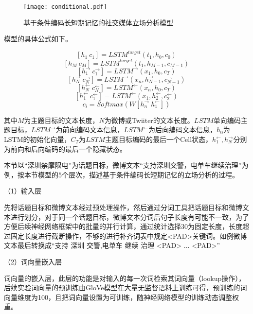 \begin{figure}[htbp]
	\centering
	\texttt{[image: conditional.pdf]}
	\caption[rnn_vanish]{基于条件编码长短期记忆的社交媒体立场分析模型}
\end{figure}

模型的具体公式如下。

\begin{equation}\label{lstm_f}[h_1~c_1] = LSTM^{target}(t_1,h_0,c_0)\end{equation}
\begin{equation}\label{lstm_f}[h_M~c_M] = LSTM^{target}(t_1,h_{M-1},c_{M-1})\end{equation}
\begin{equation}\label{lstm_f}[h^{→}_{1}~c^{→}_{1}] = LSTM^{→}(x_1,h_0,c_T)\end{equation}
\begin{equation}\label{lstm_f}[h^{→}_{N}~c^{→}_{N}] = LSTM^{→}(x_n,h^{→}_{N-1},c^{→}_{N-1})\end{equation}
\begin{equation}\label{lstm_f}[h^{←}_{N}~c^{←}_{N}] = LSTM^{←}(x_n,h_0,c_T)\end{equation}
\begin{equation}\label{lstm_f}[h^{←}_{1}~c^{←}_{1}] = LSTM^{←}(x_1,h^{←}_{2},c^{←}_{2})\end{equation}
\begin{equation}\label{lstm_f}c_i=Softmax(W[h^{→}_n~h^{←}_1])\end{equation}

其中$M$为主题目标的文本长度，$N$为微博或Twiiter的文本长度。$LSTM$单向编码主题目标，$LSTM^{→}$为前向编码文本信息，$LSTM^{←}$为后向编码文本信息，$h_0$为LSTM的初始化向量，$C_T$为$LSTM$主题目标编码的最后一个Cell状态，$h^{←}_{1},h^{→}_{N}$分别为前向和后向编码的最后一个隐藏状态。

本节以“深圳禁摩限电”为话题目标，微博文本“支持深圳交警，电单车继续治理”为例，按本节模型的5个层次，描述基于条件编码长短期记忆的立场分析的过程。

（1）输入层

先将话题目标和微博文本经过预处理操作，然后通过分词工具把话题目标和微博文本进行划分，对于同一个话题目标，微博文本分词后句子长度有可能不一致，为了方便后续神经网络框架中的批量的并行计算，通过统计选择30为固定长度，长度超过固定长度进行截断操作，不够的进行补齐词表中规定<PAD>关键词。如例微博文本最后转换成“支持 深圳 交警,电单车 继续 治理 <PAD> ... <PAD>”

（2）词向量嵌入层

词向量的嵌入层，此层的功能是对输入的每一次词检索其词向量（lookup操作），后续实验词向量的预训练由GloVe模型在大量无监督语料上训练可得，预训练的词向量维度为100，且把词向量设置为可训练，随神经网络模型的训练动态调整权重。

